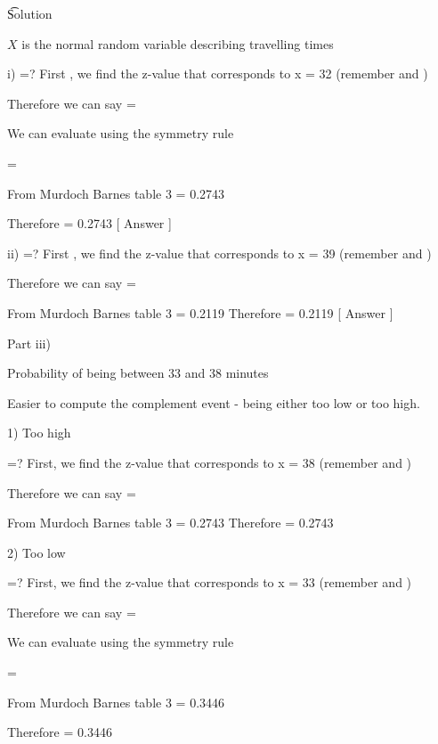 \noindent \t{Solution}

$X$ is the normal random variable describing travelling times

i)   =? 
First , we find the z-value that corresponds to x = 32 
(remember   and   )


Therefore we can say    =  

We can evaluate    using the symmetry rule

=  

From Murdoch Barnes table 3         = 0.2743

Therefore    = 0.2743         [  Answer ] 



ii)   =? 
First , we find the z-value that corresponds to x = 39 (remember   and   )



Therefore we can say    =  

From Murdoch Barnes table 3      = 0.2119   
Therefore    = 0.2119            [  Answer ] 



Part iii) 

Probability of being between 33 and 38 minutes 



Easier to compute the complement event  - being either too low or too high.

1)	Too high

=? 
First, we find the z-value that corresponds to x = 38  (remember  and   )



Therefore we can say    =  

From Murdoch Barnes table 3      = 0.2743  
Therefore    = 0.2743         


2)	 Too low

=? 
First, we find the z-value that corresponds to x = 33  (remember  and   )


Therefore we can say    =  

We can evaluate    using the symmetry rule

=  

From Murdoch Barnes table 3         = 0.3446

Therefore    = 0.3446         



